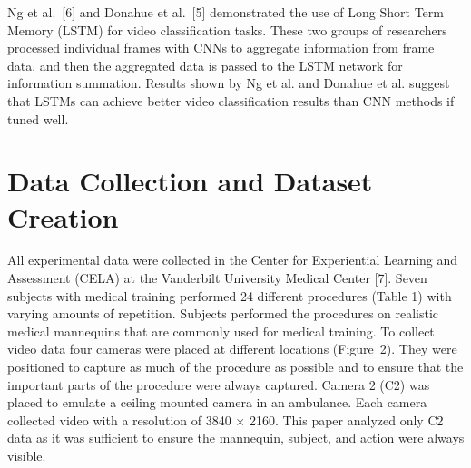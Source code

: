 \documentclass[letterpaper, 10 pt, conference]{ieeeconf}  %
\begin{document}
Ng et al.~[6] and Donahue et al.~[5] demonstrated the use of Long Short Term Memory (LSTM) for video classification tasks. These two groups of researchers processed individual frames with CNNs to aggregate information from frame data, and then the aggregated data is passed to the LSTM network for information summation. Results shown by Ng et al. and Donahue et al. suggest that LSTMs can achieve better video classification results than CNN methods if tuned well.


\section{Data Collection and Dataset Creation}

All experimental data were collected in the Center for Experiential Learning and Assessment (CELA) at the Vanderbilt University Medical Center [7]. Seven subjects with medical training performed 24 different procedures (Table 1) with varying amounts of repetition. Subjects performed the procedures on realistic medical mannequins that are commonly used for medical training. To collect video data four cameras were placed at different locations (Figure~2). They were positioned to capture as much of the procedure as possible and to ensure that the important parts of the procedure were always captured. Camera 2 (C2) was placed to emulate a ceiling mounted camera in an ambulance. Each camera collected video with a resolution of 3840 $\times$ 2160. This paper analyzed only C2 data as it was sufficient to ensure the mannequin, subject, and action were always visible.

\end{document}
